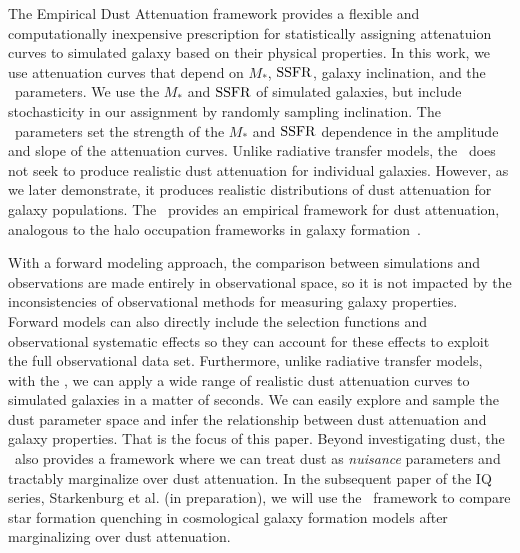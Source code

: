 The Empirical Dust Attenuation framework provides a flexible and
computationally inexpensive prescription for statistically assigning
attenatuion curves to simulated galaxy based on their physical properties. 
In this work, we use attenuation curves %
that depend on $M_*$, ${\rm SSFR}$, galaxy inclination, and the \eda~parameters.  
We use the $M_*$ and ${\rm SSFR}$ of simulated galaxies, but include stochasticity
in our assignment by randomly sampling inclination.
The \eda~parameters set the strength of the $M_*$ and ${\rm SSFR}$ dependence in the
amplitude and slope of the attenuation curves. 
Unlike radiative transfer models, the \eda~does not seek to produce realistic
dust attenuation for individual galaxies. 
However, as we later demonstrate, it produces realistic distributions of dust
attenuation for galaxy populations. 
The \eda~provides an empirical framework for dust attenuation, analogous to the
halo occupation frameworks in galaxy formation~\citep[for a review see ][]{wechsler2018}. 

With a forward modeling approach, the comparison between simulations and
observations are made entirely in observational space, so it is not impacted by
the inconsistencies of observational methods for measuring galaxy properties. 
Forward models can also directly include the selection functions and
observational systematic effects so they can account for these effects to
exploit the full observational data set.
Furthermore, unlike radiative transfer models, with the \eda, we can apply a
wide range of realistic dust attenuation curves to simulated galaxies in a
matter of seconds. 
We can easily explore and sample the dust parameter space and infer the
relationship between dust attenuation and galaxy properties. 
That is the focus of this paper. 
Beyond investigating dust, the \eda~also provides a framework where we can
treat dust as {\em nuisance} parameters and tractably marginalize over dust
attenuation. 
In the subsequent paper of the IQ series, Starkenburg et al. (in
preparation), we will use the \eda~framework to compare star formation
quenching in cosmological galaxy formation models after marginalizing over
dust attenuation. 

